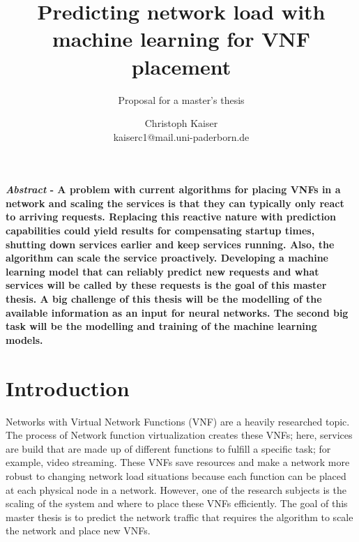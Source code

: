 \documentclass[12pt,a4paper]{scrartcl}
\begin{document}
	\title{\vspace{-4ex}Predicting network load with machine learning for VNF placement}
	\subtitle{Proposal for a master's thesis}
	\author{Christoph Kaiser \\
		kaiserc1@mail.uni-paderborn.de\vspace{1ex}}
	\maketitle
	
	\textbf{\textit{Abstract} - A problem with current algorithms for placing VNFs in a network and scaling the services is that they can typically only react to arriving requests. Replacing this reactive nature with prediction capabilities could yield results for compensating startup times, shutting down services earlier and keep services running. Also, the algorithm can scale the service proactively. Developing a machine learning model that can reliably predict new requests and what services will be called by these requests is the goal of this master thesis. A big challenge of this thesis will be the modelling of the available information as an input for neural networks. The second big task will be the modelling and training of the machine learning models.}
	
	\section{Introduction}
	Networks with Virtual Network Functions (VNF) are a heavily researched topic.
	The process of Network function virtualization creates these VNFs; here, services are build that are made up of different functions to fulfill a specific task; for example, video streaming.
	These VNFs save resources and make a network more robust to changing network load situations because each function can be placed at each physical node in a network.
	However, one of the research subjects is the scaling of the system and where to place these VNFs efficiently.
	The goal of this master thesis is to predict the network traffic that requires the algorithm to scale the network and place new VNFs.
	
\end{document}
